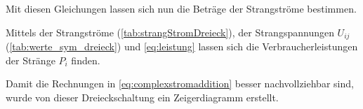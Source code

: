 \documentclass[12pt,english,ngerman]{scrartcl}
\begin{document}
Mit diesen Gleichungen lassen sich nun die Beträge der Strangströme bestimmen.

\begin{table}[H]
	\caption[Errechnete Strangströme bei der Dreiecksschaltung]{ Errechnete Strangströme
		einer symmetrisch ohmsch-belasteten Dreiecksschaltung, siehe
		\autoref{fig:aufbau1}. Zur Berechnung wurde \autoref{eq:complexstromaddition}
		und die Daten aus \autoref{tab:werte_sym_dreieck} entnommen. \\
		$I_{ij} \dots$ errechnete Strangströme vom i-ten zum j-ten Leiter in \si{\ampere}.
	}\label{tab:strangStromDreieck}
	\centering
	
\end{table}

Mittels der Strangströme (\autoref{tab:strangStromDreieck}), der
Strangspannungen $U_{ij}$ (\autoref{tab:werte_sym_dreieck}) und
\autoref{eq:leistung} lassen sich die Verbraucherleistungen der Stränge $P_i$
finden.

\begin{table}[H]
	\caption[Errechnete Leistungen bei der Dreiecksschaltung]{ Errechnete Leistungen bei der
		Dreiecksschaltung                                      \\
		$P_i^C \dots$ errechnete Leistung am i-ten Strang in W \\
		$P_{ges}^C \dots$ errechnete Gesamtleistung in W       \\
		$P_{ges}^M \dots$ gemessene Gesamtleistung in W
	}\label{tab:powerDreieck}
	\centering
	
\end{table}

Damit die Rechnungen in \autoref{eq:complexstromaddition} besser
nachvollziehbar sind, wurde von dieser Dreieckschaltung ein Zeigerdiagramm
erstellt.
\end{document}
